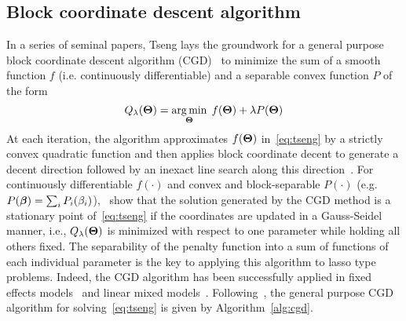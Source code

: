 \subsection{Block coordinate descent algorithm} \label{ap:cgd}

In a series of seminal papers, Tseng lays the groundwork for a general purpose block coordinate descent algorithm (CGD)~\citep{tseng2009coordinate,tseng1988coordinate,tseng2001convergence} to minimize the sum of a smooth function $f$ (i.e. continuously differentiable) and a separable convex function $P$ of the form
\begin{equation}
Q_{\lambda}(\boldsymbol{\Theta}) = \operatorname*{arg\,min}_{\boldsymbol{\Theta}}\; f(\boldsymbol{\Theta}) + \lambda P(\boldsymbol{\Theta}) \label{eq:tseng}
\end{equation}
At each iteration, the algorithm approximates $f(\boldsymbol{\Theta})$ in~\eqref{eq:tseng} by a strictly convex quadratic function and then applies block coordinate decent to generate a decent direction followed by an inexact line search along this direction~\citep{tseng2009coordinate}. 
For continuously differentiable $f(\cdot)$ and convex and block-separable $P(\cdot)$ \mbox{(e.g. $P(\boldsymbol{\beta}) = \sum_i P_i (\beta_i)$)},~\cite{tseng2009coordinate} show that the solution generated by the CGD method is a stationary point of~\eqref{eq:tseng} if the coordinates are updated in a Gauss-Seidel manner, i.e., $Q_{\lambda}(\boldsymbol{\Theta})$ is minimized with respect to one parameter while holding all others fixed. 
The separability of the penalty function into a sum of functions of each individual parameter is the key to applying this algorithm to lasso type problems. 
Indeed, the CGD algorithm has been successfully applied in fixed effects models~\citep{meier2008group,friedman2010regularization} and linear mixed models~\citep{schelldorfer2011estimation}. Following~\cite{tseng2009coordinate}, the general purpose CGD algorithm for solving~\eqref{eq:tseng} is given by Algorithm~\ref{alg:cgd}. 

